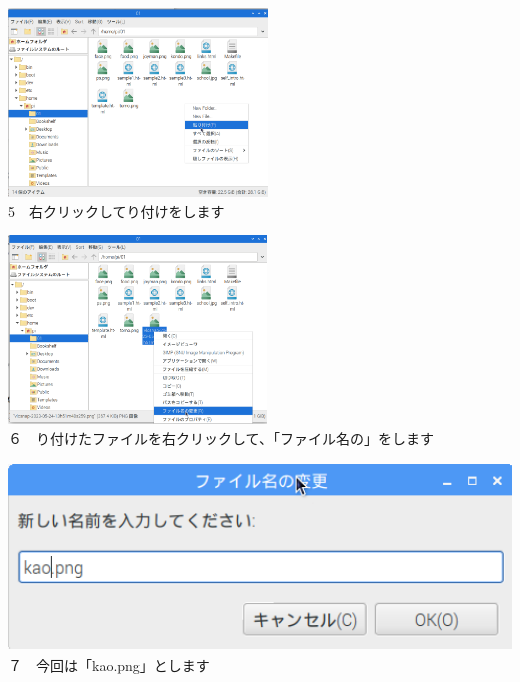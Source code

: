 \documentclass[a4paper,12pt]{jarticle}
\begin{document}
\centering
\begin{minipage}{0.45\linewidth}
  \includegraphics[width=\linewidth,height=5cm]{textbook-img168.png}\\
  5　右クリックしてり付けをします
\end{minipage}
\hfill
\vspace{20pt}
\begin{minipage}{0.45\linewidth}
  \includegraphics[width=\linewidth,height=5cm]{textbook-img169.png}\\
  ６　り付けたファイルを右クリックして、「ファイル名の」をします
\end{minipage}
\begin{minipage}{0.45\linewidth}
  \includegraphics[width=\linewidth,height=5cm]{textbook-img166.png}\\
  ７　今回は「kao.png」とします
\end{minipage}
\hfill
\vspace{20pt}
\end{document}
